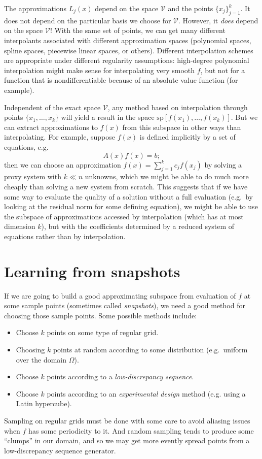 \documentclass[12pt, leqno]{article} %
\begin{document}
The approximations $L_j(x)$ depend on the space $\mathcal{V}$ and
the points $\{x_j\}_{j=1}^k$.  It does not depend on the particular
basis we choose for $\mathcal{V}$.  However, it {\em does} depend on
the space $\mathcal{V}$!  With the same set of points, we can get many
different interpolants associated with different approximation spaces
(polynomial spaces, spline spaces, piecewise linear spaces, or
others).  Different interpolation schemes are appropriate under
different regularity assumptions: high-degree polynomial
interpolation might make sense for interpolating very smooth $f$,
but not for a function that is nondifferentiable because of an
absolute value function (for example).

Independent of the exact space $\mathcal{V}$, any method based on
interpolation through points $\{x_1, \ldots, x_k\}$ will yield a
result in the space $\mathrm{sp}[f(x_1), \ldots, f(x_k)]$.
But we can extract approximations to $f(x)$ from this subspace in
other ways than interpolating.  For example, suppose $f(x)$ is defined
implicitly by a set of equations, e.g.
\[
  A(x) f(x) = b;
\]
then we can choose an approximation $f(x) = \sum_{j=1}^k c_j f(x_j)$
by solving a proxy system with $k \ll n$ unknowns, which we might be
able to do much more cheaply than solving a new system from scratch.
This suggests that if we have some way to evaluate the quality of a
solution without a full evaluation (e.g.~by looking at the residual
norm for some defining equation), we might be able to use the
subspace of approximations accessed by interpolation
(which has at most dimension $k$), but with the coefficients
determined by a reduced system of equations rather than by interpolation.

\section{Learning from snapshots}

If we are going to build a good approximating subspace from evaluation
of $f$ at some sample points (sometimes called {\em snapshots}), we
need a good method for choosing those sample points.  Some possible
methods include:
\begin{itemize}
\item Choose $k$ points on some type of regular grid.
\item Choosing $k$ points at random according to some distribution
  (e.g.~uniform over the domain $\Omega$).
\item Choose $k$ points according to a {\em low-discrepancy sequence}.
\item Choose $k$ points according to an {\em experimental design}
  method (e.g. using a Latin hypercube).
\end{itemize}
Sampling on regular grids must be done with some care to avoid
aliasing issues when $f$ has some periodicity to it.  And random
sampling tends to produce some ``clumps'' in our domain, and so we may
get more evently spread points from a low-discrepancy sequence generator.
\end{document}
